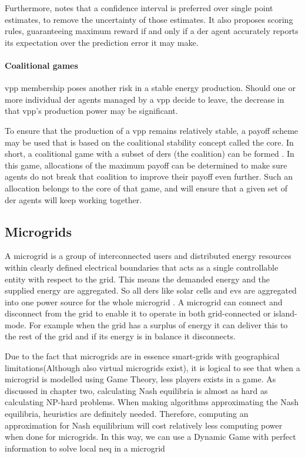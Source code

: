 Furthermore, \cite{RobuKotaChalkiadakisEtAl2012} notes that a confidence interval is preferred over single point estimates, to remove the uncertainty of those estimates. It also proposes scoring rules, guaranteeing maximum reward if and only if a \ac{der} agent accurately reports its expectation over the prediction error it may make.  

\paragraph{Coalitional games}
\label{vpp:coalition}
\ac{vpp} membership poses another risk in a stable energy production. Should one or more individual \ac{der} agents managed by a \ac{vpp} decide to leave, the decrease in that \ac{vpp}'s production power may be significant. 

To ensure that the production of a \ac{vpp} remains relatively stable, a payoff scheme may be used that is based on the coalitional stability concept called the core. In short, a coalitional game with a subset of \acp{der} (the coalition) can be formed \cite{MihailescuVasiraniOssowski2011}. In this game, allocations of the maximum payoff can be determined to make sure agents do not break that coalition to improve their payoff even further\cite{ChalkiadakisRobuKotaEtAl2011, YeungPoonWu1999, SaadHanPoor2011}. Such an allocation belongs to the core of that game, and will ensure that a given set of \ac{der} agents will keep working together.

\subsection{Microgrids}
A microgrid is a group of interconnected users and distributed energy resources within clearly defined electrical boundaries that acts as a single controllable entity with respect to the grid. This means the demanded energy and the supplied energy are aggregated. So all \acp{der} like solar cells and \acp{ev} are aggregated into one power source for the whole microgrid \cite{KanchevLuColasEtAl2011}. A microgrid can connect and disconnect from the grid to enable it to operate in both grid-connected or island-mode. For example when the grid has a surplus of energy it can deliver this to the rest of the grid and if its energy is in balance it disconnects. 

Due to the fact that microgrids are in essence smart-grids with geographical limitations(Although also virtual microgrids exist), it is logical to see that when a microgrid is modelled using Game Theory, less players exists in a game. As discussed in chapter two, calculating Nash equilibria is almost as hard as calculating NP-hard problems. When making algorithms approximating the Nash equilibria, heuristics are definitely needed. Therefore, computing an approximation for Nash equilibrium will cost relatively less computing power when done for microgrids. In this way, we can use a Dynamic Game with perfect information to solve local \ac{neq} in a microgrid

